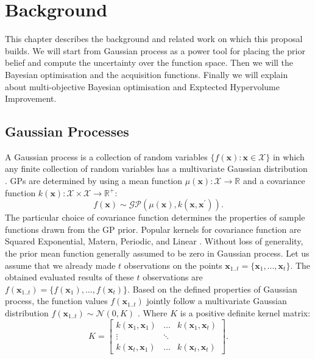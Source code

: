 \chapter{Background}
This chapter describes the background and related work on which this proposal builds.
We will start from Gaussian process as a power tool for placing the prior belief and compute the uncertainty over the function space. Then we will the  Bayesian optimisation and the acquisition functions. Finally we will explain about multi-objective Bayesian optimisation and Exptected Hypervolume Improvement.

\section{Gaussian Processes}
A Gaussian process is a collection of random variables $\{f(\textbf{x}) : \textbf{x} \in \mathcal{X}\}$ in which any finite collection of random variables has a multivariate
Gaussian distribution \cite{rasmussen2006gaussian}. GPs are determined by using a mean function $\mu(\textbf{x}): \mathcal{X} \rightarrow \mathbb{R}$ and 
a covariance function $k(\textbf{x}): \mathcal{X} \times \mathcal{X} \rightarrow \mathbb{R}^+$:
\begin{equation}
f(\textbf{x}) \sim \mathcal{GP}(\mu(\textbf{x}),k(\textbf{x},\textbf{x}^{\prime})).
\end{equation}
The particular choice of covariance function determines the properties of sample functions drawn from the GP prior.
Popular kernels for covariance function are Squared Exponential, Matern, Periodic, and Linear \cite{wilson2013gaussian}. 
Without loss of generality, the prior mean function generally assumed to be zero in Gaussian process.
Let us assume that we already made $t$ observations on the points $\textbf{x}_{1..t} = \{\textbf{x}_1,...,\textbf{x}_t\}$. The obtained evaluated results of these $t$ observations are $f(\textbf{x}_{1..t}) = \{f(\textbf{x}_1),...,f(\textbf{x}_t)\}$. Based on the defined properties of Gaussian process, the function values  $f(\textbf{x}_{1..t})$ jointly follow a multivariate Gaussian distribution $f(\textbf{x}_{1..t}) \sim \mathcal{N}(0,K)$ \cite{li2017rapid}. Where $K$ is a positive definite kernel matrix:
\[
K = \begin{bmatrix} 
    k(\textbf{x}_1,\textbf{x}_1) & \dots & k(\textbf{x}_1,\textbf{x}_t)\\
    \vdots & \ddots  \\
    k(\textbf{x}_t,\textbf{x}_1) & \dots  & k(\textbf{x}_t,\textbf{x}_t)
    \end{bmatrix}.
\]
